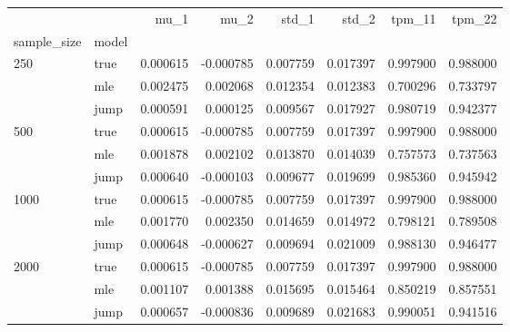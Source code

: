 \begin{tabular}{llrrrrrr}
\toprule
     &      &      mu\_1 &      mu\_2 &     std\_1 &     std\_2 &    tpm\_11 &    tpm\_22 \\
sample\_size & model &           &           &           &           &           &           \\
\midrule
250  & true &  0.000615 & -0.000785 &  0.007759 &  0.017397 &  0.997900 &  0.988000 \\
     & mle &  0.002475 &  0.002068 &  0.012354 &  0.012383 &  0.700296 &  0.733797 \\
     & jump &  0.000591 &  0.000125 &  0.009567 &  0.017927 &  0.980719 &  0.942377 \\
500  & true &  0.000615 & -0.000785 &  0.007759 &  0.017397 &  0.997900 &  0.988000 \\
     & mle &  0.001878 &  0.002102 &  0.013870 &  0.014039 &  0.757573 &  0.737563 \\
     & jump &  0.000640 & -0.000103 &  0.009677 &  0.019699 &  0.985360 &  0.945942 \\
1000 & true &  0.000615 & -0.000785 &  0.007759 &  0.017397 &  0.997900 &  0.988000 \\
     & mle &  0.001770 &  0.002350 &  0.014659 &  0.014972 &  0.798121 &  0.789508 \\
     & jump &  0.000648 & -0.000627 &  0.009694 &  0.021009 &  0.988130 &  0.946477 \\
2000 & true &  0.000615 & -0.000785 &  0.007759 &  0.017397 &  0.997900 &  0.988000 \\
     & mle &  0.001107 &  0.001388 &  0.015695 &  0.015464 &  0.850219 &  0.857551 \\
     & jump &  0.000657 & -0.000836 &  0.009689 &  0.021683 &  0.990051 &  0.941516 \\
\bottomrule
\end{tabular}
